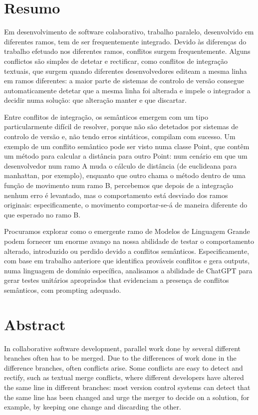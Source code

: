 \chapter*{Resumo}

Em desenvolvimento de software colaborativo, trabalho paralelo, desenvolvido em diferentes ramos, tem de ser frequentemente integrado. Devido às diferenças do trabalho efetuado nos diferentes ramos, conflitos surgem frequentemente. Alguns conflictos são simples de detetar e rectificar, como conflitos de integração textuais, que surgem quando diferentes desenvolvedores editeam a mesma linha em ramos diferentes: a maior parte de sistemas de controlo de versão consegue automaticamente detetar que a mesma linha foi alterada e impele o integrador a decidir numa solução: que alteração manter e que discartar.

Entre conflitos de integração, os semânticos emergem com um tipo particularmente difícil de resolver, porque não são detetados por sistemas de controlo de versão e, não tendo erros sintáticos, compilam com sucesso. Um exemplo de um conflito semântico pode ser visto numa classe Point, que contêm um método para calcular a distância para outro Point: num cenário em que um desenvolvedor num ramo A muda o cálculo de distância (de euclideana para manhattan, por exemplo), enquanto que outro chama o método dentro de uma função de movimento num ramo B, percebemos que depois de a integração nenhum erro é levantado, mas o comportamento está desviado dos ramos originais: especificamente, o movimento comportar-se-á de maneira diferente do que esperado no ramo B.

Procuramos explorar como o emergente ramo de Modelos de Linguagem Grande podem fornecer um enorme avanço na nossa abilidade de testar o comportamento alterado, introduzido ou perdido devido a conflitos semânticos.
Especificamente, com base em trabalho anteriore que identifica prováveis conflitos e gera outputs, numa linguagem de domínio específica, analisamos a abilidade de ChatGPT para gerar testes unitários apropriados that evidenciam a presença de conflitos semânticos, com prompting adequado.


\chapter*{Abstract}

In collaborative software development, parallel work done by several different branches often has to be merged. Due to the differences of work done in the difference branches, often conflicts arise. Some conflicts are easy to detect and rectify, such as textual merge conflicts, where different developers have altered the same line in different branches: most version control systems can detect that the same line has been changed and urge the merger to decide on a solution, for example, by keeping one change and discarding the other.

